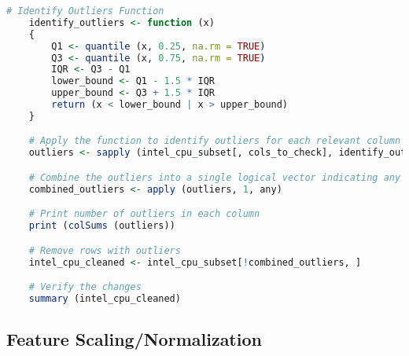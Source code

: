 \begin{lstlisting}[language=R]
    # Identify Outliers Function
    identify_outliers <- function (x) 
    {
        Q1 <- quantile (x, 0.25, na.rm = TRUE)
        Q3 <- quantile (x, 0.75, na.rm = TRUE)
        IQR <- Q3 - Q1
        lower_bound <- Q1 - 1.5 * IQR
        upper_bound <- Q3 + 1.5 * IQR
        return (x < lower_bound | x > upper_bound)
    }

    # Apply the function to identify outliers for each relevant column
    outliers <- sapply (intel_cpu_subset[, cols_to_check], identify_outliers)

    # Combine the outliers into a single logical vector indicating any row with an outlier
    combined_outliers <- apply (outliers, 1, any)

    # Print number of outliers in each column
    print (colSums (outliers))

    # Remove rows with outliers
    intel_cpu_cleaned <- intel_cpu_subset[!combined_outliers, ]

    # Verify the changes
    summary (intel_cpu_cleaned)
\end{lstlisting}

\subsection{Feature Scaling/Normalization}

\newpage